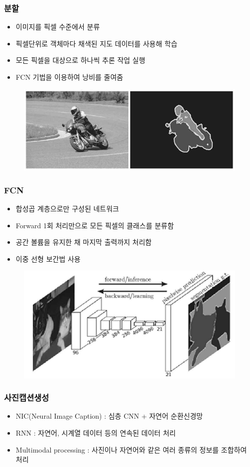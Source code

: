 \documentclass{beamer}
\begin{document}
\begin{frame}
	\frametitle{분할}
		\begin{itemize}
			\item 이미지를 픽셀 수준에서 분류
			\item 픽셀단위로 객체마다 채색된 지도 데이터를 사용해 학습
			\item 모든 픽셀을 대상으로 하나씩 추론 작업 실행
			\item FCN 기법을 이용하여 낭비를 줄여줌
		\end{itemize}
		\begin{figure}
			\includegraphics[width=0.8\columnwidth]{Fig_deep/Figure_12.pdf}
		\end{figure}
\end{frame}

\begin{frame}
	\frametitle{FCN}
		\begin{itemize}
			\item 합성곱 계층으로만 구성된 네트워크
			\item Forward 1회 처리만으로 모든 픽셀의 클래스를 분류함
			\item 공간 볼륨을 유지한 채 마지막 출력까지 처리함
			\item 이중 선형 보간법 사용
		\end{itemize}
		\begin{figure}
			\includegraphics[width=0.8\columnwidth]{Fig_deep/Figure_13.pdf}
		\end{figure}
\end{frame}

\begin{frame}
	\frametitle{사진캡션생성}
	\begin{itemize}
		\item NIC(Neural Image Caption) : 심층 CNN + 자연어 순환신경망
		\item RNN : 자연어, 시계열 데이터 등의 연속된 데이터 처리
		\item Multimodal processing : 사진이나 자연어와 같은 여러 종류의 정보를 조합하여 처리
	\end{itemize}
\end{frame}
\end{document}
